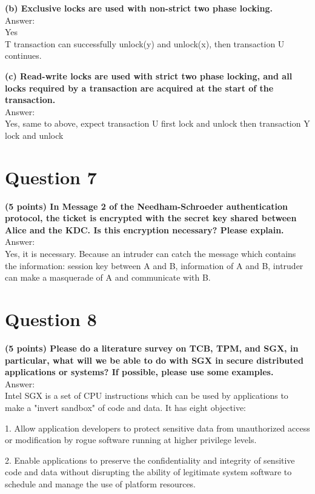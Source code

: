 \documentclass{article}
\begin{document}
\textbf{(b)	Exclusive locks are used with non-strict two phase locking.}\\

Answer:\\
Yes\\
T transaction can successfully unlock(y) and unlock(x), then transaction U continues.

\textbf{(c)	Read-write locks are used with strict two phase locking, and all locks required by a transaction are acquired at the start of the transaction.}\\

Answer:\\
Yes, same to above, expect transaction U first lock and unlock then transaction Y lock and unlock

\clearpage


\section{Question 7}
\textbf{(5 points) In Message 2 of the Needham-Schroeder authentication protocol, the ticket is encrypted with the secret key shared between Alice and the KDC. Is this encryption necessary? Please explain.}\\

Answer:\\
Yes, it is necessary. Because an intruder can catch the message which contains the information: session key between A and B, information of A and B, intruder can make a masquerade of A and communicate with B.

\clearpage
\section{Question 8}
\textbf{(5 points) Please do a literature survey on TCB, TPM, and SGX, in particular, what will we be able to do with SGX in secure distributed applications or systems? If possible, please use some examples.}\\

Answer:\\
Intel SGX is a set of CPU instructions which can be used by applications to make a "invert sandbox" of code and data. It has eight objective:

1. Allow application developers to protect sensitive data from unauthorized access or modification by rogue software running at higher privilege levels.

2. Enable applications to preserve the confidentiality and integrity of sensitive code and data without disrupting the ability of legitimate system software to schedule and manage the use of platform resources.
\end{document}
